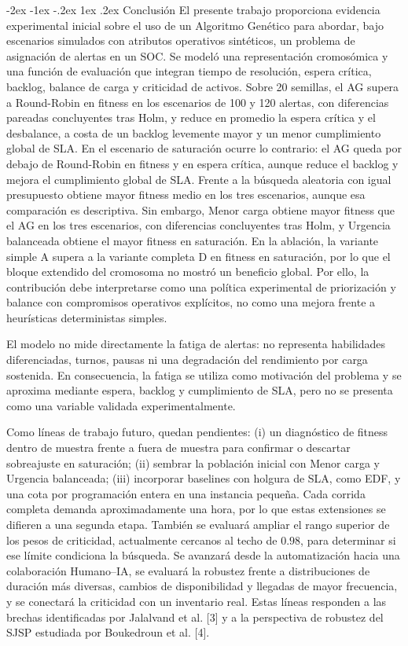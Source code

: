 \documentclass[12pt,a4paper,twocolumn]{article}
\makeatletter
\renewcommand{\section}{\@startsection{section}{1}{\z@}%
  {-2ex \@plus -1ex \@minus -.2ex}%
  {1ex \@plus.2ex}%
  {\fontsize{12}{14}\selectfont\bfseries}}
\makeatother
\begin{document}
\section{Conclusión}
El presente trabajo proporciona evidencia experimental inicial sobre el uso de un Algoritmo Genético para abordar, bajo escenarios simulados con atributos operativos sintéticos, un problema de asignación de alertas en un SOC. Se modeló una representación cromosómica y una función de evaluación que integran tiempo de resolución, espera crítica, backlog, balance de carga y criticidad de activos. Sobre 20 semillas, el AG supera a Round-Robin en fitness en los escenarios de 100 y 120 alertas, con diferencias pareadas concluyentes tras Holm, y reduce en promedio la espera crítica y el desbalance, a costa de un backlog levemente mayor y un menor cumplimiento global de SLA. En el escenario de saturación ocurre lo contrario: el AG queda por debajo de Round-Robin en fitness y en espera crítica, aunque reduce el backlog y mejora el cumplimiento global de SLA. Frente a la búsqueda aleatoria con igual presupuesto obtiene mayor fitness medio en los tres escenarios, aunque esa comparación es descriptiva. Sin embargo, Menor carga obtiene mayor fitness que el AG en los tres escenarios, con diferencias concluyentes tras Holm, y Urgencia balanceada obtiene el mayor fitness en saturación. En la ablación, la variante simple A supera a la variante completa D en fitness en saturación, por lo que el bloque extendido del cromosoma no mostró un beneficio global. Por ello, la contribución debe interpretarse como una política experimental de priorización y balance con compromisos operativos explícitos, no como una mejora frente a heurísticas deterministas simples.

El modelo no mide directamente la fatiga de alertas: no representa habilidades diferenciadas, turnos, pausas ni una degradación del rendimiento por carga sostenida. En consecuencia, la fatiga se utiliza como motivación del problema y se aproxima mediante espera, backlog y cumplimiento de SLA, pero no se presenta como una variable validada experimentalmente.

Como líneas de trabajo futuro, quedan pendientes: (i) un diagnóstico de fitness dentro de muestra frente a fuera de muestra para confirmar o descartar sobreajuste en saturación; (ii) sembrar la población inicial con Menor carga y Urgencia balanceada; (iii) incorporar baselines con holgura de SLA, como EDF, y una cota por programación entera en una instancia pequeña. Cada corrida completa demanda aproximadamente una hora, por lo que estas extensiones se difieren a una segunda etapa. También se evaluará ampliar el rango superior de los pesos de criticidad, actualmente cercanos al techo de $0.98$, para determinar si ese límite condiciona la búsqueda. Se avanzará desde la automatización hacia una colaboración Humano--IA, se evaluará la robustez frente a distribuciones de duración más diversas, cambios de disponibilidad y llegadas de mayor frecuencia, y se conectará la criticidad con un inventario real. Estas líneas responden a las brechas identificadas por Jalalvand et al. [3] y a la perspectiva de robustez del SJSP estudiada por Boukedroun et al. [4].
\end{document}
